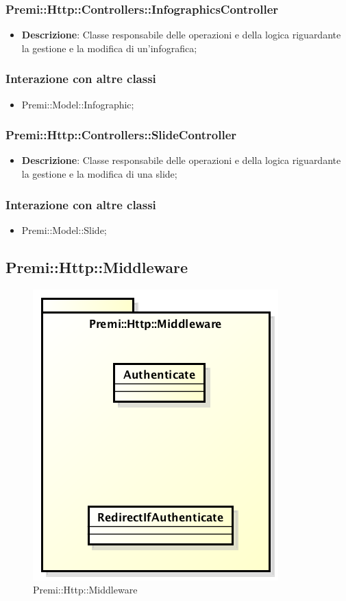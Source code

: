 	\subsubsection*{Premi::Http::Controllers::InfographicsController}
			\begin{itemize}
				\item \textbf{Descrizione}: Classe responsabile delle operazioni e della logica riguardante la gestione e la modifica di un'\gls{infografica};
			\end{itemize}
			\subsubsection*{Interazione con altre classi}
			\begin{itemize}
				\item Premi::Model::Infographic;
			\end{itemize}
			
	\subsubsection*{Premi::Http::Controllers::SlideController}
			\begin{itemize}
				\item \textbf{Descrizione}: Classe responsabile delle operazioni e della logica riguardante la gestione e la modifica di una \gls{slide};
			\end{itemize}
			\subsubsection*{Interazione con altre classi}
			\begin{itemize}
				\item Premi::Model::Slide;
			\end{itemize}
		
\newpage
\subsection{Premi::Http::Middleware}
\begin{figure}[h]
\centering
\includegraphics[width=0.6\linewidth]{img/premi_http_middleware}
\caption[Premi::Http::Middleware]{Premi::Http::Middleware}
\label{fig:premi_http_middleware}
\end{figure}

